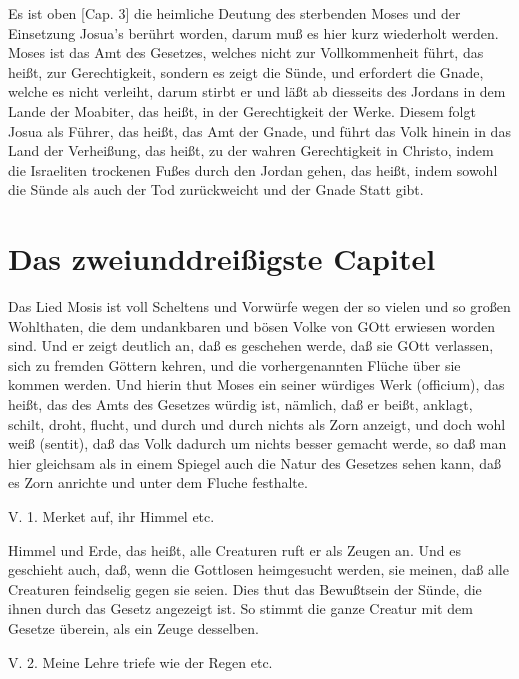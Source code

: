 Es ist oben [Cap. 3] die heimliche Deutung des sterbenden Moses und der Einsetzung Josua’s berührt worden, darum muß es hier kurz wiederholt werden. Moses ist das Amt des Gesetzes, welches nicht zur Vollkommenheit führt, das heißt, zur Gerechtigkeit, sondern es zeigt die Sünde, und erfordert die Gnade, welche es nicht verleiht, darum stirbt er und läßt ab diesseits des Jordans in dem Lande der Moabiter, das heißt, in der Gerechtigkeit der Werke. Diesem folgt Josua als Führer, das heißt, das Amt der Gnade, und führt das Volk hinein in das Land der Verheißung, das heißt, zu der wahren Gerechtigkeit in Christo, indem die Israeliten trockenen Fußes durch den Jordan gehen, das heißt, indem sowohl die Sünde als auch der Tod zurückweicht und der Gnade Statt gibt.

\section{Das zweiunddreißigste Capitel}

Das Lied Mosis ist voll Scheltens und Vorwürfe wegen der so vielen und so großen Wohlthaten, die dem undankbaren und bösen Volke von GOtt erwiesen worden sind. Und er zeigt deutlich an, daß es geschehen werde, daß sie GOtt verlassen, sich zu fremden Göttern kehren, und die vorhergenannten Flüche über sie kommen werden. Und hierin thut Moses ein seiner würdiges Werk (officium), das heißt, das des Amts des Gesetzes würdig ist, nämlich, daß er beißt, anklagt, schilt, droht, flucht, und durch und durch nichts als Zorn anzeigt, und doch wohl weiß (sentit), daß das Volk dadurch um nichts besser gemacht werde, so daß man hier gleichsam als in einem Spiegel auch die Natur des Gesetzes sehen kann, daß es Zorn anrichte und unter dem Fluche festhalte.

\begin{schriftzitat}
V. 1. Merket auf, ihr Himmel etc.
\end{schriftzitat}

Himmel und Erde, das heißt, alle Creaturen ruft er als Zeugen an. Und es geschieht auch, daß, wenn die Gottlosen heimgesucht werden, sie meinen, daß alle Creaturen feindselig gegen sie seien. Dies thut das Bewußtsein der Sünde, die ihnen durch das Gesetz angezeigt ist. So stimmt die ganze Creatur mit dem Gesetze überein, als ein Zeuge desselben.

\begin{schriftzitat}
V. 2. Meine Lehre triefe wie der Regen etc.
\end{schriftzitat}

